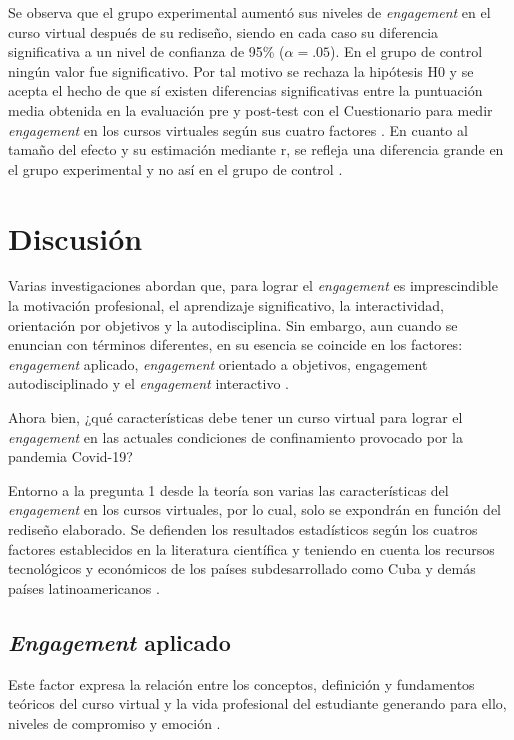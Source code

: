 \documentclass{textolivre}
\begin{document}
Se observa que el grupo experimental aumentó sus niveles de \emph{engagement} en el curso virtual después de su rediseño, siendo en cada caso su diferencia significativa a un nivel de confianza de 95\% ($\alpha = .05$). En el grupo de control ningún valor fue significativo. Por tal motivo se rechaza la hipótesis H0 y se acepta el hecho de que sí existen diferencias significativas entre la puntuación media obtenida en la evaluación pre y post-test con el Cuestionario para medir \emph{engagement} en los cursos virtuales según sus cuatro factores \cite{mohd2020}. %
En cuanto al tamaño del efecto y su estimación mediante r, se refleja una diferencia grande en el grupo experimental y no así en el grupo de control \cite{cohen1988}. %

\section{Discusión}
Varias investigaciones \cite{bakker2018, mohd2020, sim2021} %
abordan que, para lograr el \emph{engagement} es imprescindible la motivación profesional, el aprendizaje significativo, la interactividad, orientación por objetivos y la autodisciplina. Sin embargo, aun cuando se enuncian con términos diferentes, en su esencia se coincide en los factores: \emph{engagement} aplicado, \emph{engagement} orientado a objetivos, engagement autodisciplinado y el \emph{engagement} interactivo \cite{handelsman2005, mohd2020}. %

Ahora bien, ¿qué características debe tener un curso virtual para lograr el \emph{engagement} en las actuales condiciones de confinamiento provocado por la pandemia Covid-19?

Entorno a la pregunta 1 desde la teoría \cite{mohd2020} %
son varias las características del \emph{engagement} en los cursos virtuales, por lo cual, solo se expondrán en función del rediseño elaborado. Se defienden los resultados estadísticos según los cuatros factores establecidos en la literatura científica y teniendo en cuenta los recursos tecnológicos y económicos de los países subdesarrollado como Cuba y demás países latinoamericanos \cite{murillo2020}. %

\subsection{\emph{Engagement} aplicado}
Este factor expresa la relación entre los conceptos, definición y fundamentos teóricos del curso virtual y la vida profesional del estudiante generando para ello, niveles de compromiso y emoción \cite{handelsman2005, shumow2013}. %
\end{document}
